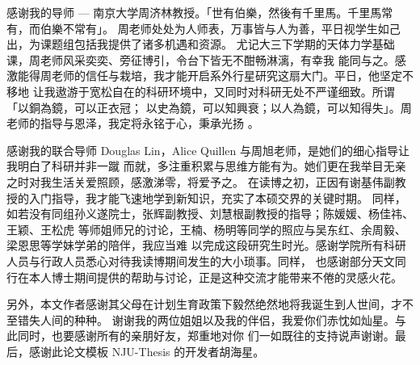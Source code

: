 \begin{acknowledgement}

感谢我的导师 --- 南京大学周济林教授。「世有伯樂，然後有千里馬。千里馬常有，而伯樂不常有」。
周老师处处为人师表，万事皆与人为善，平日视学生如己出，为课题组包括我提供了诸多机遇和资源。
尤记大三下学期的天体力学基础课，周老师风采奕奕、旁征博引，令台下皆无不酣畅淋漓，有幸我
能同与之。感激能得周老师的信任与栽培，我才能开启系外行星研究这扇大门。平日，他坚定不移地
让我遨游于宽松自在的科研环境中，又同时对科研无处不严谨细致。所谓「以銅為鏡，可以正衣冠；
以史為鏡，可以知興衰；以人為鏡，可以知得失」。周老师的指导与恩泽，我定将永铭于心，秉承光扬 。

\vspace{1em}

感谢我的联合导师 Douglas Lin，Alice Quillen 与周旭老师，是她们的细心指导让我明白了科研并非一蹴
而就，多注重积累与思维方能有为。她们更在我举目无亲之时对我生活关爱照顾，感激涕零，将爱予之。
在读博之初，正因有谢基伟副教授的入门指导，我才能飞速地学到新知识，充实了本硕交界的关键时期。
同样，如若没有同组孙义遂院士，张辉副教授、刘慧根副教授的指导；陈媛媛、杨佳祎、王颖、王松虎
等师姐师兄的讨论，王楠、杨明等同学的照应与吴东红、余周毅、梁恩思等学妹学弟的陪伴，我应当难
以完成这段研究生时光。感谢学院所有科研人员与行政人员悉心对待我读博期间发生的大小琐事。同样，
也感谢部分天文同行在本人博士期间提供的帮助与讨论，正是这种交流才能带来不倦的灵感火花。

\vspace{1em}

另外，本文作者感谢其父母在计划生育政策下毅然绝然地将我诞生到人世间，才不至错失人间的种种。
谢谢我的两位姐姐以及我的伴侣，我爱你们赤忱如灿星。与此同时，也要感谢所有的亲朋好友，郑重地对你
们一如既往的支持说声谢谢。最后，感谢此论文模板 NJU-Thesis 的开发者胡海星。


\end{acknowledgement}
